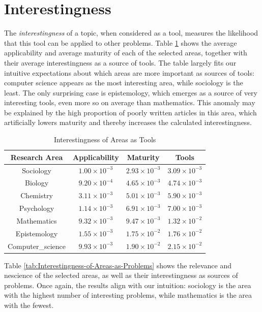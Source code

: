 %
%
\section{Interestingness}

The \emph{interestingness} of a topic, when considered as a tool, measures the likelihood that this tool can be applied to other problems. Table \ref{tab:Interestingness-of-Areas-as-Tools} shows the average applicability and average maturity of each of the selected areas, together with their average interestingness as a source of tools. The table largely fits our intuitive expectations about which areas are more important as sources of tools: computer science appears as the most interesting area, while sociology is the least. The only surprising case is epistemology, which emerges as a source of very interesting tools, even more so on average than mathematics. This anomaly may be explained by the high proportion of poorly written articles in this area, which artificially lowers maturity and thereby increases the calculated interestingness.

\begin{table}
\begin{centering}
\begin{tabular}{|c|c|c|c|}
\hline 
Research Area & Applicability & Maturity & Tools\tabularnewline
\hline 
\hline 
Sociology & $1.00\times10^{-3}$ & $2.93\times10^{-3}$ & $3.09\times10^{-3}$\tabularnewline
\hline 
Biology & $9.20\times10^{-4}$ & $4.65\times10^{-3}$ & $4.74\times10^{-3}$\tabularnewline
\hline 
Chemistry & $3.11\times10^{-3}$ & $5.01\times10^{-3}$ & $5.90\times10^{-3}$\tabularnewline
\hline 
Psychology & $1.14\times10^{-3}$ & $6.91\times10^{-3}$ & $7.00\times10^{-3}$\tabularnewline
\hline 
Mathematics & $9.32\times10^{-3}$ & $9.47\times10^{-3}$ & $1.32\times10^{-2}$\tabularnewline
\hline 
Epistemology & $1.55\times10^{-3}$ & $1.75\times10^{-2}$ & $1.76\times10^{-2}$\tabularnewline
\hline 
Computer\_science & $9.93\times10^{-3}$ & $1.90\times10^{-2}$ & $2.15\times10^{-2}$\tabularnewline
\hline 
\end{tabular}
\par\end{centering}

\caption{\label{tab:Interestingness-of-Areas-as-Tools}Interestingness of Areas
as Tools}
\end{table}

Table \ref{tab:Interestingness-of-Areas-as-Problems} shows the relevance and nescience of the selected areas, as well as their interestingness as sources of problems. Once again, the results align with our intuition: sociology is the area with the highest number of interesting problems, while mathematics is the area with the fewest.

